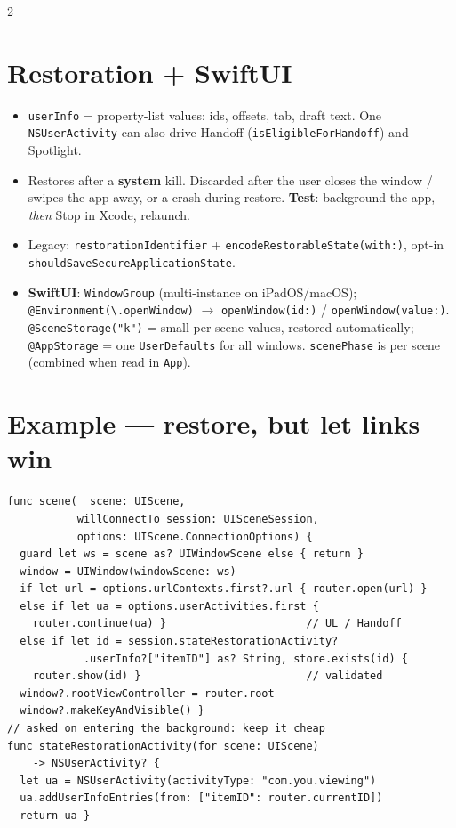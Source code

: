 \documentclass[8pt]{extarticle}
\begin{document}
\begin{multicols}{2}
\section{Restoration + SwiftUI}
\begin{itemize}
  \item \texttt{userInfo} = property-list values: ids, offsets, tab, draft text.
        One \texttt{NSUserActivity} can also drive Handoff
        (\texttt{isEligibleForHandoff}) and Spotlight.
  \item Restores after a \textbf{system} kill. Discarded after the user closes the
        window / swipes the app away, or a crash during restore. \textbf{Test}:
        background the app, \emph{then} Stop in Xcode, relaunch.
  \item Legacy: \texttt{restorationIdentifier} + \texttt{encodeRestorableState(with:)},
        opt-in \texttt{shouldSaveSecureApplicationState}.
  \item \textbf{SwiftUI}: \texttt{WindowGroup} (multi-instance on iPadOS/macOS);
        \texttt{@Environment(\textbackslash.openWindow)} $\to$
        \texttt{openWindow(id:)} / \texttt{openWindow(value:)}.
        \texttt{@SceneStorage("k")} = small per-scene values, restored
        automatically; \texttt{@AppStorage} = one \texttt{UserDefaults} for all
        windows. \texttt{scenePhase} is per scene (combined when read in
        \texttt{App}).
\end{itemize}

\section{Example — restore, but let links win}
\begin{lstlisting}[language=SwiftSheet]
func scene(_ scene: UIScene,
           willConnectTo session: UISceneSession,
           options: UIScene.ConnectionOptions) {
  guard let ws = scene as? UIWindowScene else { return }
  window = UIWindow(windowScene: ws)
  if let url = options.urlContexts.first?.url { router.open(url) }
  else if let ua = options.userActivities.first {
    router.continue(ua) }                      // UL / Handoff
  else if let id = session.stateRestorationActivity?
            .userInfo?["itemID"] as? String, store.exists(id) {
    router.show(id) }                          // validated
  window?.rootViewController = router.root
  window?.makeKeyAndVisible() }
// asked on entering the background: keep it cheap
func stateRestorationActivity(for scene: UIScene)
    -> NSUserActivity? {
  let ua = NSUserActivity(activityType: "com.you.viewing")
  ua.addUserInfoEntries(from: ["itemID": router.currentID])
  return ua }
\end{lstlisting}


\end{multicols}
\end{document}
